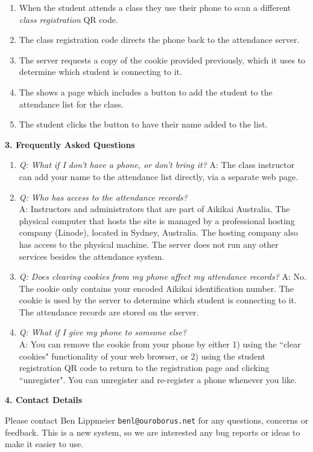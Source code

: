 \begin{minipage}[t]{\dimexpr0.5\linewidth-1em}
\begin{center}
\begin{enumerate}
\item When the student attends a class they use their phone to scan
      a different \emph{class registration} QR code.
\item The class registration code directs the phone back to the
      attendance server.
\item The server requests a copy of the cookie provided previously,
      which it uses to determine which student is connecting to it.
\item The shows a page which includes a button to add the
      student to the attendance list for the class.
\item The student clicks the button to have their name added to the list.
\end{enumerate}
\end{center}


\smallskip
\textbf{3. Frequently Asked Questions}
\begin{enumerate}
\item \emph{Q: What if I don't have a phone, or don't bring it?}
      A: The class instructor can add your name to the attendance list
         directly, via a separate web page.

\item \emph{Q: Who has access to the attendance records?} \\
      A: Instructors and administrators that are part of Aikikai Australia.
         The physical computer that hosts the site is managed by a professional
         hosting company (Linode), located in Sydney, Australia. The hosting company
         also has access to the physical machine. The server does not run any other
         services besides the attendance system.

\item \emph{Q: Does clearing cookies from my phone affect my attendance records?}
      A: No. The cookie only contains your encoded Aikikai identification number.
         The cookie is used by the server to determine which student
         is connecting to it. The attendance records are stored on the server.

\item \emph{Q: What if I give my phone to someone else?} \\
      A: You can remove the cookie from your phone by either 1) using the ``clear cookies"
         functionality of your web browser, or 2) using the student registration QR code to return
         to the registration page and clicking ``unregister". You can unregister
         and re-register a phone whenever you like.
\end{enumerate}


\medskip
\textbf{4. Contact Details}

Please contact Ben Lippmeier \texttt{benl@ouroborus.net} for
any questions, concerns or feedback.
This is a new system, so we are interested any bug reports or
ideas to make it easier to use.
\end{minipage}

